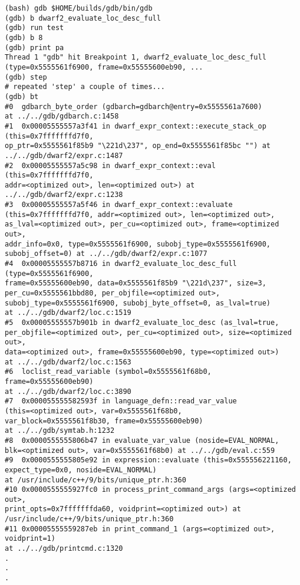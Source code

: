 \documentclass{report}
\begin{document}
\begin{itemize}
	\begin{verbatim}
(bash) gdb $HOME/builds/gdb/bin/gdb	
(gdb) b dwarf2_evaluate_loc_desc_full
(gdb) run test
(gdb) b 8
(gdb) print pa
Thread 1 "gdb" hit Breakpoint 1, dwarf2_evaluate_loc_desc_full (type=0x5555561f6900, frame=0x55555600eb90, ...
(gdb) step
# repeated 'step' a couple of times...
(gdb) bt
#0  gdbarch_byte_order (gdbarch=gdbarch@entry=0x5555561a7600) 
at ../../gdb/gdbarch.c:1458
#1  0x00005555557a3f41 in dwarf_expr_context::execute_stack_op 
(this=0x7fffffffd7f0, 
op_ptr=0x5555561f85b9 "\221d\237", op_end=0x5555561f85bc "") at  
../../gdb/dwarf2/expr.c:1487
#2  0x00005555557a5c98 in dwarf_expr_context::eval (this=0x7fffffffd7f0, 
addr=<optimized out>, len=<optimized out>) at ../../gdb/dwarf2/expr.c:1238
#3  0x00005555557a5f46 in dwarf_expr_context::evaluate 
(this=0x7fffffffd7f0, addr=<optimized out>, len=<optimized out>,
as_lval=<optimized out>, per_cu=<optimized out>, frame=<optimized out>, 
addr_info=0x0, type=0x5555561f6900, subobj_type=0x5555561f6900, 
subobj_offset=0) at ../../gdb/dwarf2/expr.c:1077
#4  0x00005555557b8716 in dwarf2_evaluate_loc_desc_full (type=0x5555561f6900, 
frame=0x55555600eb90, data=0x5555561f85b9 "\221d\237", size=3, 
per_cu=0x5555561bbd80, per_objfile=<optimized out>, 
subobj_type=0x5555561f6900, subobj_byte_offset=0, as_lval=true) 
at ../../gdb/dwarf2/loc.c:1519
#5  0x00005555557b901b in dwarf2_evaluate_loc_desc (as_lval=true, 
per_objfile=<optimized out>, per_cu=<optimized out>, size=<optimized out>,
data=<optimized out>, frame=0x55555600eb90, type=<optimized out>) 
at ../../gdb/dwarf2/loc.c:1563
#6  loclist_read_variable (symbol=0x5555561f68b0, frame=0x55555600eb90) 
at ../../gdb/dwarf2/loc.c:3890
#7  0x000055555582593f in language_defn::read_var_value 
(this=<optimized out>, var=0x5555561f68b0, 
var_block=0x5555561f8b30, frame=0x55555600eb90) 
at ../../gdb/symtab.h:1232
#8  0x0000555555806b47 in evaluate_var_value (noside=EVAL_NORMAL, 
blk=<optimized out>, var=0x5555561f68b0) at ../../gdb/eval.c:559
#9  0x0000555555805e92 in expression::evaluate (this=0x555556221160, 
expect_type=0x0, noside=EVAL_NORMAL)
at /usr/include/c++/9/bits/unique_ptr.h:360
#10 0x0000555555927fc0 in process_print_command_args (args=<optimized out>,
print_opts=0x7fffffffda60, voidprint=<optimized out>) at  
/usr/include/c++/9/bits/unique_ptr.h:360
#11 0x00005555559287eb in print_command_1 (args=<optimized out>, voidprint=1) 
at ../../gdb/printcmd.c:1320
.
.
.
	\end{verbatim}
	

\end{itemize}
\end{document}
